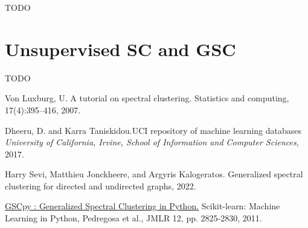 \documentclass[a4paper,12pt]{article}
\theoremstyle{definition}
\theoremstyle{plain}
\begin{document}
TODO
\newpage
\appendix
\section{Unsupervised SC and GSC} \label{app-unsupervised}
TODO
\newpage

\begin{thebibliography}{9}
Von Luxburg, U. A tutorial on spectral clustering. Statistics and
computing, 17(4):395–416, 2007.

Dheeru, D. and Karra Taniskidou.UCI repository of machine learning databases \textit{University of California, Irvine, School of
	Information and Computer Sciences}, 2017.

Harry Sevi, Matthieu Jonckheere, and Argyris Kalogeratos.
Generalized spectral clustering for directed and undirected graphs,
2022.

\href{https://github.com/Malik-Hacini/GSCpy}{GSCpy : Generalized Spectral Clustering in Python.}
Scikit-learn: Machine Learning in Python, Pedregosa et al., JMLR 12, pp. 2825-2830, 2011.
\end{thebibliography}
\end{document}
